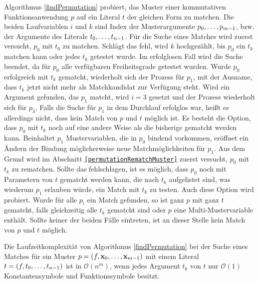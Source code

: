 Algorithmus \ref{findPermutation} probiert, das Muster einer kommutativen Funktionsanwendung $p$ auf ein Literal $t$ der gleichen Form zu matchen. Die beiden Laufvariablen $i$ und $k$ sind Index der Musterargumente ${p}_{0}, \dots, {p}_{m-1}$, bzw. der Argumente des Literals ${t}_{0}, \dots, {t}_{n-1}$. Für die Suche eines Matches wird zuerst versucht, $p_0$ mit $t_0$ zu matchen. Schlägt das fehl, wird $k$ hochgezählt, bis $p_0$ ein $t_k$ matchen kann oder jedes $t_k$ getestet wurde. Im erfolglosen Fall wird die Suche beendet, da für $p_0$ alle verfügbaren Freiheitsgrade getestet wurden. Wurde $p_0$ erfolgreich mit $t_k$ gematcht, wiederholt sich der Prozess für $p_1$, mit der Ausname, dass $t_k$ jetzt nicht mehr als Matchkandidat zur Verfügung steht. Wird ein Argument gefunden, das $p_1$ matcht, wird $i = 3$ gesetzt und der Prozess wiederholt sich für $p_3$. Falls die Suche für $p_1$ in dem Durchlauf erfolglos war, heißt es allerdings nicht, dass kein Match von $p$ und $t$ möglich ist. Es besteht die Option, dass $p_0$ mit $t_k$ noch auf eine andere Weise als die bisherige gematcht werden kann. Beinhaltet $p_1$ Mustervariablen, die in $p_0$ bindend vorkommen, eröffnet ein Ändern der Bindung möglicherweise neue Matchmöglichkeiten für $p_1$. Aus dem Grund wird im Abschnitt \texttt{\ref{permutationRematchMuster}} zuerst versucht, $p_0$ mit $t_k$ zu rematchen. Sollte das fehlschlagen, ist es möglich, dass $p_0$ noch mit Parametern von $t$ gematcht werden kann, die nach $t_k$ aufgelistet sind, was wiederum $p_1$ erlauben würde, ein Match mit $t_k$ zu testen. Auch diese Option wird probiert.
Wurde für alle $p_i$ ein Match gefunden, so ist ganz $p$ mit ganz $t$ gematcht, falls gleichzeitig alle $t_k$ gematcht sind oder $p$ eine Multi-Mustervariable enthält. Sollte keiner der beiden Fälle eintreten, ist an dieser Stelle kein Match von $p$ und $t$ möglich. 


\begin{lemma}\label{lemKomplexitaetFindPermutation}
Die Laufzeitkomplexität von Algorithmus \ref{findPermutation} bei der Suche eines Matches für ein Muster $p = (f, {\mathbf x}_{0}, \dots, {\mathbf x}_{m-1})$ mit einem Literal $t = (f, {t}_{0}, \dots, {t}_{n-1})$ ist in $\mathcal O(n^m)$, wenn jedes Argument $t_k$ von $t$ nur $\mathcal O(1)$ Konstantensymbole und Funktionssymbole besitzt.
\end{lemma}

